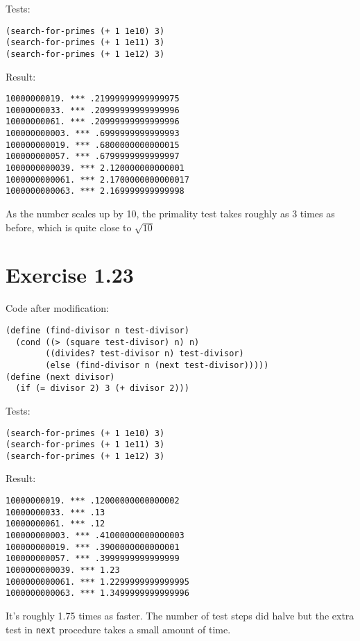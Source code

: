 \documentclass[../main.tex]{subfiles}
\begin{document}
Tests:

\begin{lstlisting}
(search-for-primes (+ 1 1e10) 3)
(search-for-primes (+ 1 1e11) 3)
(search-for-primes (+ 1 1e12) 3)
\end{lstlisting}

Result:

\begin{lstlisting}
10000000019. *** .21999999999999975
10000000033. *** .20999999999999996
10000000061. *** .20999999999999996
100000000003. *** .6999999999999993
100000000019. *** .6800000000000015
100000000057. *** .6799999999999997
1000000000039. *** 2.120000000000001
1000000000061. *** 2.1700000000000017
1000000000063. *** 2.169999999999998
\end{lstlisting}

As the number scales up by 10, the primality
 test takes roughly as 3 times as before, which is
 quite close to $\sqrt{10}$

\section{Exercise 1.23}

Code after modification:

\begin{lstlisting}
(define (find-divisor n test-divisor)
  (cond ((> (square test-divisor) n) n)
        ((divides? test-divisor n) test-divisor)
        (else (find-divisor n (next test-divisor)))))
(define (next divisor)
  (if (= divisor 2) 3 (+ divisor 2)))
\end{lstlisting}

Tests:

\begin{lstlisting}
(search-for-primes (+ 1 1e10) 3)
(search-for-primes (+ 1 1e11) 3)
(search-for-primes (+ 1 1e12) 3)
\end{lstlisting}

Result:

\begin{lstlisting}
10000000019. *** .12000000000000002
10000000033. *** .13
10000000061. *** .12
100000000003. *** .41000000000000003
100000000019. *** .3900000000000001
100000000057. *** .3999999999999999
1000000000039. *** 1.23
1000000000061. *** 1.2299999999999995
1000000000063. *** 1.3499999999999996
\end{lstlisting}

It's roughly 1.75 times as faster. The number of test steps
 did halve but the extra test in \lstinline{next} procedure
 takes a small amount of time.
\end{document}
